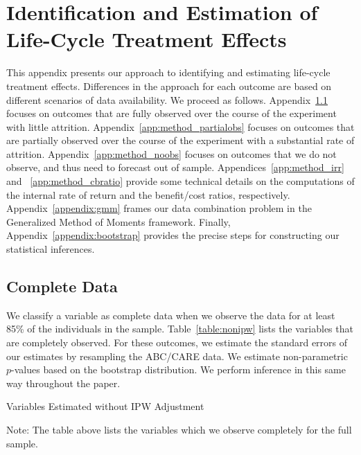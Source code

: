 \section{Identification and Estimation of Life-Cycle Treatment Effects} \label{appendix:methodology}

This appendix presents our approach to identifying and estimating life-cycle treatment effects. Differences in the approach for each outcome are based on different scenarios of data availability. We proceed as follows. Appendix~\ref{app:method_fullobs} focuses on outcomes that are fully observed over the course of the experiment with little attrition. Appendix~\ref{app:method_partialobs} focuses on outcomes that are partially observed over the course of the experiment with a substantial rate of attrition. Appendix~\ref{app:method_noobs}  focuses on outcomes that we do not observe, and thus need to forecast out of sample. Appendices~\ref{app:method_irr} and ~\ref{app:method_cbratio} provide some technical details on the computations of the internal rate of return and the benefit/cost ratios, respectively. Appendix~\ref{appendix:gmm} frames our data combination problem in the Generalized Method of Moments framework. Finally, Appendix~\ref{appendix:bootstrap} provides the precise steps for constructing our statistical inferences.

\subsection{Complete Data}\label{app:method_fullobs}

We classify a variable as complete data when we observe the data for at least 85\% of the individuals in the sample. Table~\ref{table:nonipw} lists the variables that are completely observed. For these outcomes, we estimate the standard errors of our estimates by resampling the ABC/CARE data. We estimate non-parametric $p$-values based on the bootstrap distribution. We perform inference in this same way throughout the paper.

\begin{table}[H]
\begin{threeparttable}
\caption{Variables Estimated without IPW Adjustment}
\label{table:nonipw}
\centering

\begin{tablenotes}
\footnotesize
\item Note: The table above lists the variables which we observe completely for the full sample.
\end{tablenotes}
\end{threeparttable}
\end{table}

